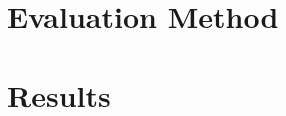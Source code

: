 \section{Evaluation Method} \label{section:experiments-evaluationmethod}

\section{Results} \label{section:experiments-results}

